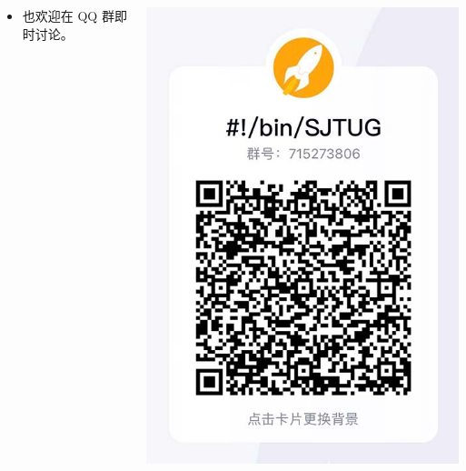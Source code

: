 \begin{frame}
\begin{columns}
\begin{column}{0.73\textwidth}
\begin{itemize}
        \item[{\faQq}] 也欢迎在 QQ 群即时讨论。
      \end{itemize}
    \end{column}
    \begin{column}{0.27\textwidth}
      \includegraphics[height=0.7\textheight]{support/images/qq.jpg}
    \end{column}
  \end{columns}
\end{frame}
